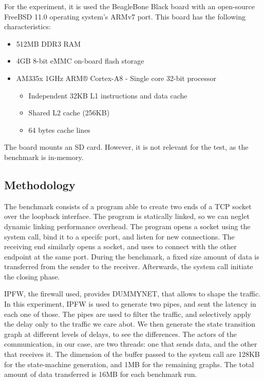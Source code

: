 \documentclass[a4paper,10pt]{article}
\begin{document}
For the experiment, it is used the BeagleBone Black board with an open-source FreeBSD\cite{mckusick_design_2014} 11.0 operating system’s ARMv7 port. This board has the following characteristics:
\begin{itemize}
    \item 512MB DDR3 RAM
    \item 4GB 8-bit eMMC on-board flash storage
    \item AM335x 1GHz ARM® Cortex-A8 - Single core 32-bit processor\cite{noauthor_am3358_nodate}
    \begin{itemize}
        \item Independent 32KB L1 instructions and data cache
        \item Shared L2 cache (256KB)
        \item 64 bytes cache lines
    \end{itemize}
\end{itemize}

The board mounts an SD card. However, it is not relevant for the test, as the benchmark is in-memory.
      

\subsection {Methodology}

The benchmark consists of a program able to create two ends of a TCP socket over the loopback interface. The program is statically linked, so we can neglet dynamic linking performance overhead. The program opens a socket using the  system call, bind it to a specifc port, and listen for new connections. The receiving end similarly opens a socket, and uses  to connect with the other endpoint at the same port. During the benchmark, a fixed size amount of data is transferred from the sender to the receiver. Afterwards, the  system call initiate the closing phase.

IPFW, the firewall used, provides DUMMYNET\cite{luigirizzo_luigirizzodummynet_2020}, that allows to shape the traffic. In this experiment, IPFW is used to generate two pipes, and sent the latency in each one of those. The pipes are used to filter the traffic, and selectively apply the delay only to the traffic we care abot. We then generate the state transition graph at different levels of delays, to see the differences.
The actors of the communication, in our case, are two threads: one that sends data, and the other that receives it. The dimension of the buffer passed to the  system call are 128KB for the state-machine generation, and 1MB for the remaining graphs.
The total amount of data transferred is 16MB for each benchmark run.
\end{document}
